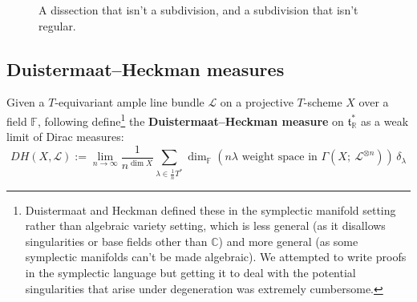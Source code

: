 \documentclass[11pt]{amsart}
\theoremstyle{definition}
\newcommand{\RR}{\mathbb{R}}
\newcommand{\CC}{\mathbb{C}}
\newcommand\defn[1]{{\bf #1}}
\newcommand\lie[1]{{\mathfrak #1}}
\newcommand\FF{{\mathbb F}}
\newcommand\tensor\otimes
\newcommand\calL{{\mathcal L}}
\begin{document}
\begin{figure}[h]
  \centering
{}
  \qquad
{}
  \caption{A dissection that isn't a subdivision, and a subdivision that isn't regular.}
  \label{fig:dissections}
\end{figure}


\subsection{Duistermaat--Heckman measures}

Given a $T$-equivariant ample line bundle $\calL$ on a projective $T$-scheme $X$
over a field $\FF$, following \cite{brion1990action,guillemin1996symplectic}
define\footnote{%
  Duistermaat and Heckman defined these in the symplectic manifold setting rather than
  algebraic variety setting, which is less general (as it disallows singularities
  or base fields other than $\CC$) and more general (as some symplectic manifolds
  can't be made algebraic). We attempted to write proofs in the symplectic
  language but getting it to deal with the potential singularities that arise
  under degeneration was extremely cumbersome.}
the \defn{Duistermaat--Heckman measure} on $\lie t_\RR^*$
as a weak limit of Dirac measures:
\begin{equation}\label{eq:DH-def}
	DH(X,\calL) := \lim_{n\to\infty} \frac{1}{n^{\dim X}}
	\sum_{\lambda \in \frac{1}{n}T^*}
	\dim_\FF(n\lambda\text{ weight space in }\Gamma(X;\ \calL^{\tensor n}))
	\, \delta_\lambda
\end{equation}
\end{document}
